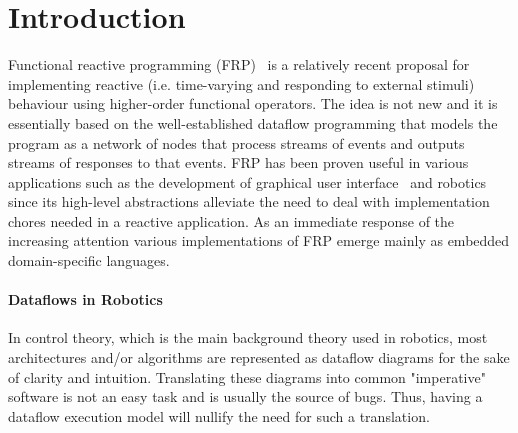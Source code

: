 \documentclass[sigplan,review,anonymous]{acmart}
\begin{document}

\maketitle

\section{Introduction} \label{sec:introduction}

Functional reactive programming (FRP)~\cite{fran} is a relatively recent
proposal for implementing reactive (i.e. time-varying
and responding to external stimuli) behaviour using higher-order functional operators.
The idea is not new and it is essentially based on the well-established dataflow programming
that models the program as a network of nodes that process streams of events
and outputs streams of responses to that events. FRP has been proven useful in
various applications such as the development of graphical user interface~\cite{fran} and robotics~\cite{arrows_robots}
since its high-level abstractions alleviate the need to deal with implementation
chores needed in a reactive application. As an immediate response of the increasing
attention various implementations of FRP emerge mainly as embedded domain-specific languages.


\paragraph{Dataflows in Robotics}

In control theory, which is the main background theory used in robotics, most
architectures and/or algorithms are represented as dataflow diagrams for the
sake of clarity and intuition. Translating these diagrams into common
"imperative" software is not an easy task and is usually the source of bugs.
Thus, having a dataflow execution model will nullify the need for such a
translation.
\end{document}
